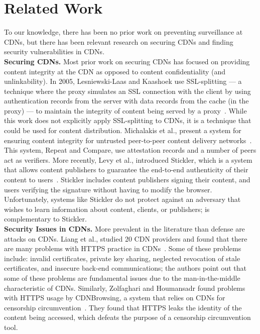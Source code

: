 \section{Related Work}
\label{sec:related}

To our knowledge, there has been no prior work on preventing surveillance at CDNs, but there 
has been relevant research on securing CDNs and finding security vulnerabilities in CDNs.\\
\vspace{0pt}
\textbf{Securing CDNs.} Most prior work on securing CDNs has focused on providing content 
integrity at the CDN as opposed to content confidentiality (and unlinkability).  In 2005, 
Lesniewski-Laas and Kaashoek use SSL-splitting --- a technique 
where the proxy simulates an SSL connection with the client by using authentication records from 
the server with data records from the cache (in the proxy) --- to maintain the 
integrity of content being served by a proxy~\cite{lesniewski2005ssl}.  While this work does not 
explicitly apply SSL-splitting to CDNs, it is a technique that could be used for content 
distribution.  Michalakis et al., present a system for ensuring content integrity for untrusted 
peer-to-peer content delivery networks~\cite{michalakis2007ensuring}.  This system, Repeat and 
Compare, use attestation records and a number of peers act as verifiers.  More recently, Levy et al., 
introduced Stickler, which is a system that allows content publishers to guarantee the end-to-end 
authenticity of their content to users~\cite{levy2015stickler}.  Stickler includes content publishers 
signing their content, and users verifying the signature without having to modify the browser.  Unfortunately, 
systems like Stickler do not protect against an adversary that wishes to learn information about content, clients, 
or publishers; \system{} is complementary to Stickler.\\
\vspace{0pt}
\textbf{Security Issues in CDNs.} More prevalent in the literature than defense are attacks on CDNs.  Liang et al., studied 
20 CDN providers and found that there are many problems with HTTPS practice in CDNs~\cite{liang2014https}.  Some of these 
problems include: invalid certificates, private key sharing, neglected revocation of stale certificates, and 
insecure back-end communications; the authors point out that some of these problems are fundamental issues due to 
the man-in-the-middle characteristic of CDNs.  Similarly, Zolfaghari and Houmansadr found problems with HTTPS usage by 
CDNBrowsing, a system that relies on CDNs for censorship circumvention~\cite{zolfaghari2016practical}.  They found that HTTPS 
leaks the identity of the content being accessed, which defeats the purpose of a censorship circumvention tool. 

